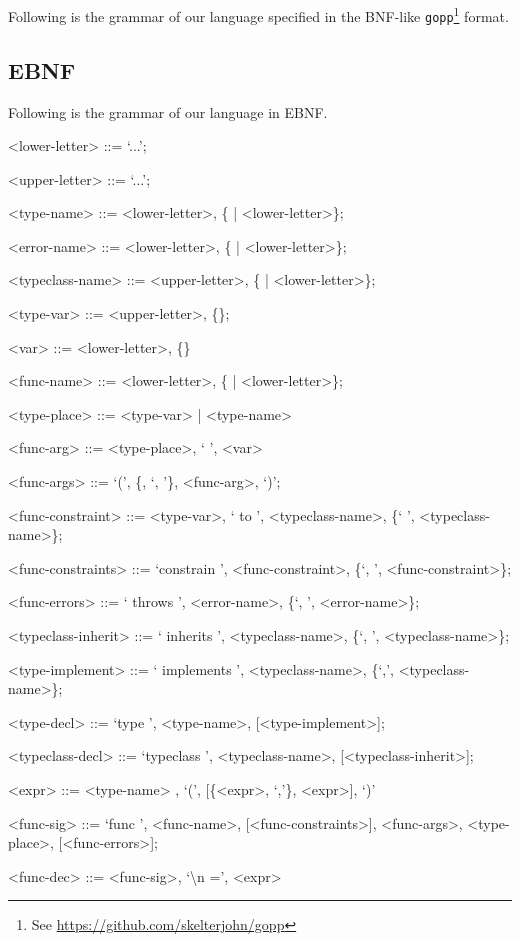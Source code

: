 \documentclass[10pt]{article}
\begin{document}
Following is the grammar of our language specified in the BNF-like
\texttt{gopp}\footnote{See \url{https://github.com/skelterjohn/gopp}} format.

%

\subsection{EBNF}

Following is the grammar of our language in EBNF.

\begin{grammar}
    <lower-letter> ::= `...';

    <upper-letter> ::= `...';

    <type-name> ::= <lower-letter>, \{<upper-letter> |
     <lower-letter>\};

    <error-name> ::= <lower-letter>, \{<upper-letter>
     | <lower-letter>\};

    <typeclass-name> ::= <upper-letter>, \{<upper-letter>
     | <lower-letter>\};

    <type-var> ::= <upper-letter>, \{<upper-letter>\};

    <var> ::= <lower-letter>, \{<lower-letter>\}

    <func-name> ::= <lower-letter>, \{<upper-letter>
     | <lower-letter>\};

    <type-place> ::= <type-var> | <type-name>

    <func-arg> ::= <type-place>, ` ', <var>

    <func-args> ::= `(', \{<func-arg>, `, '\}, <func-arg>, `)';

    <func-constraint> ::= <type-var>, ` to ', <typeclass-name>,
     \{` ', <typeclass-name>\};

    <func-constraints> ::= `constrain ', <func-constraint>,
     \{`, ', <func-constraint>\};

    <func-errors> ::= ` throws ', <error-name>,
     \{`, ', <error-name>\};

    <typeclass-inherit> ::= ` inherits ', <typeclass-name>,
     \{`, ', <typeclass-name>\};

    <type-implement> ::= ` implements ', <typeclass-name>,
    \{`,', <typeclass-name>\};

    <type-decl> ::= `type ', <type-name>, [<type-implement>];

    <typeclass-decl> ::= `typeclass ',
    <typeclass-name>, [<typeclass-inherit>];

    <expr> ::= <type-name>
    , `(', [\{<expr>, `,'\}, <expr>], `)'

    <func-sig> ::= `func ', <func-name>, [<func-constraints>], 
    <func-args>, <type-place>, [<func-errors>];

    <func-dec> ::= <func-sig>, `\textbackslash n =', <expr> 
\end{grammar}
\end{document}
